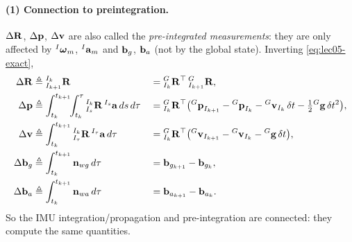 \paragraph{(1) Connection to preintegration.} $\Delta\boldsymbol{\mathbf{R}}$, $\Delta\boldsymbol{\mathbf{p}}$, $\Delta\boldsymbol{\mathbf{v}}$ are also called the \emph{pre-integrated measurements}: they are only affected by ${}^{I}\boldsymbol{\mathbf{\omega}}_m$, ${}^{I}\boldsymbol{\mathbf{a}}_m$ and $\boldsymbol{\mathbf{b}}_g$, $\boldsymbol{\mathbf{b}}_a$ (not by the global state). Inverting \eqref{eq:lec05-exact},
\begin{align}
\Delta\boldsymbol{\mathbf{R}} &\triangleq {}^{I_k}_{I_{k+1}}\boldsymbol{\mathbf{R}}
&&= {}^{G}_{I_k}\boldsymbol{\mathbf{R}}^\top\,{}^{G}_{I_{k+1}}\boldsymbol{\mathbf{R}}, \\
\Delta\boldsymbol{\mathbf{p}} &\triangleq \int_{t_k}^{t_{k+1}}\!\!\int_{t_k}^{\tau} {}^{I_k}_{I_s}\boldsymbol{\mathbf{R}}\,{}^{I_s}\boldsymbol{\mathbf{a}}\,ds\,d\tau
&&= {}^{G}_{I_k}\boldsymbol{\mathbf{R}}^\top\big({}^{G}\boldsymbol{\mathbf{p}}_{I_{k+1}} - {}^{G}\boldsymbol{\mathbf{p}}_{I_k} - {}^{G}\boldsymbol{\mathbf{v}}_{I_k}\,\delta t - \tfrac{1}{2}{}^{G}\boldsymbol{\mathbf{g}}\,\delta t^2\big), \\
\Delta\boldsymbol{\mathbf{v}} &\triangleq \int_{t_k}^{t_{k+1}} {}^{I_k}_{I_\tau}\boldsymbol{\mathbf{R}}\,{}^{I_\tau}\boldsymbol{\mathbf{a}}\,d\tau
&&= {}^{G}_{I_k}\boldsymbol{\mathbf{R}}^\top\big({}^{G}\boldsymbol{\mathbf{v}}_{I_{k+1}} - {}^{G}\boldsymbol{\mathbf{v}}_{I_k} - {}^{G}\boldsymbol{\mathbf{g}}\,\delta t\big), \\
\Delta\boldsymbol{\mathbf{b}}_g &\triangleq \int_{t_k}^{t_{k+1}} \boldsymbol{\mathbf{n}}_{wg}\,d\tau
&&= \boldsymbol{\mathbf{b}}_{g_{k+1}} - \boldsymbol{\mathbf{b}}_{g_k}, \\
\Delta\boldsymbol{\mathbf{b}}_a &\triangleq \int_{t_k}^{t_{k+1}} \boldsymbol{\mathbf{n}}_{wa}\,d\tau
&&= \boldsymbol{\mathbf{b}}_{a_{k+1}} - \boldsymbol{\mathbf{b}}_{a_k}.
\end{align}
So the IMU integration/propagation and pre-integration are connected: they compute the same quantities.

